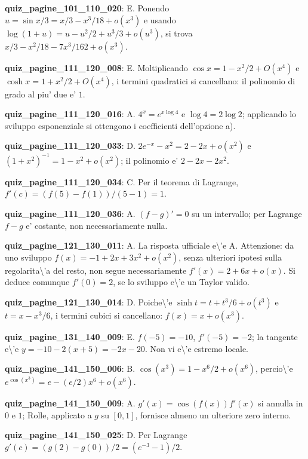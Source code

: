 \documentclass[11pt,a4paper]{article}
\newcounter{quiz}
\begin{document}
\noindent\textbf{quiz\_pagine\_101\_110\_020}: E. Ponendo $u=\sin x/3=x/3-x^3/18+o(x^3)$ e usando $\log(1+u)=u-u^2/2+u^3/3+o(u^3)$, si trova $x/3-x^2/18-7x^3/162+o(x^3)$.\par\medskip
\noindent\textbf{quiz\_pagine\_111\_120\_008}: E. Moltiplicando $\cos x=1-x^2/2+O(x^4)$ e $\cosh x=1+x^2/2+O(x^4)$, i termini quadratici si cancellano: il polinomio di grado al piu' due e' $1$.\par\medskip
\noindent\textbf{quiz\_pagine\_111\_120\_016}: A. $4^x=e^{x\log4}$ e $\log4=2\log2$; applicando lo sviluppo esponenziale si ottengono i coefficienti dell'opzione a).\par\medskip
\noindent\textbf{quiz\_pagine\_111\_120\_033}: D. $2e^{-x}-x^2=2-2x+o(x^2)$ e $(1+x^2)^{-1}=1-x^2+o(x^2)$; il polinomio e' $2-2x-2x^2$.\par\medskip
\noindent\textbf{quiz\_pagine\_111\_120\_034}: C. Per il teorema di Lagrange, $f'(c)=(f(5)-f(1))/(5-1)=1$.\par\medskip
\noindent\textbf{quiz\_pagine\_111\_120\_036}: A. $(f-g)'=0$ su un intervallo; per Lagrange $f-g$ e' costante, non necessariamente nulla.\par\medskip
\noindent\textbf{quiz\_pagine\_121\_130\_011}: A. La risposta ufficiale e\textbackslash{}'e A. Attenzione: da uno sviluppo $f(x)=-1+2x+3x^2+o(x^2)$, senza ulteriori ipotesi sulla regolarita\textbackslash{}'a del resto, non segue necessariamente $f'(x)=2+6x+o(x)$. Si deduce comunque $f'(0)=2$, se lo sviluppo e\textbackslash{}'e un Taylor valido.\par\medskip
\noindent\textbf{quiz\_pagine\_121\_130\_014}: D. Poiche\textbackslash{}'e $\sinh t=t+t^3/6+o(t^3)$ e $t=x-x^3/6$, i termini cubici si cancellano: $f(x)=x+o(x^3)$.\par\medskip
\noindent\textbf{quiz\_pagine\_131\_140\_009}: E. $f(-5)=-10$, $f\prime(-5)=-2$; la tangente e\textbackslash{}'e $y=-10-2(x+5)=-2x-20$. Non vi e\textbackslash{}'e estremo locale.\par\medskip
\noindent\textbf{quiz\_pagine\_141\_150\_006}: B. $\cos(x^3)=1-x^6/2+o(x^6)$, percio\textbackslash{}'e $e^{\cos(x^3)}=e-(e/2)x^6+o(x^6)$.\par\medskip
\noindent\textbf{quiz\_pagine\_141\_150\_009}: A. $g\prime(x)=\cos(f(x))f\prime(x)$ si annulla in $0$ e $1$; Rolle, applicato a $g$ su $[0,1]$, fornisce almeno un ulteriore zero interno.\par\medskip
\noindent\textbf{quiz\_pagine\_141\_150\_025}: D. Per Lagrange $g\prime(c)=(g(2)-g(0))/2=(e^{-3}-1)/2$.\par\medskip
\end{document}

